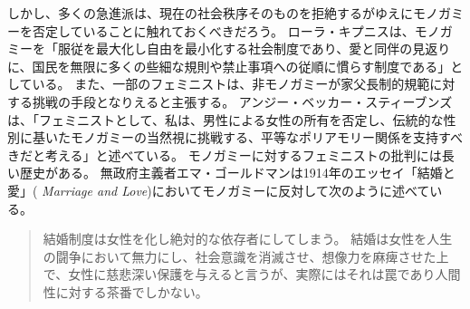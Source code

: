 \documentclass[paper=a4,book,openany]{jlreq}
\newcommand{\ig}[1]{}           %
\begin{document}
しかし、多くの急進派は、現在の社会秩序そのものを拒絶するがゆえにモノガミーを否定していることに触れておくべきだろう。
ローラ・キプニスは、モノガミーを「服従を最大化し自由を最小化する社会制度であり、愛と同伴の見返りに、国民を無限に多くの些細な規則や禁止事項への従順に慣らす制度である」としている\citep{kipnis03:_troub_marriag}。
また、一部のフェミニストは、非モノガミーが家父長制的規範に対する挑戦の手段となりえると主張する。
アンジー・ベッカー・スティーブンズは、「フェミニストとして、私は、男性による女性の所有を否定し、伝統的な性別に基いたモノガミーの当然視に挑戦する、平等なポリアモリー関係を支持すべきだと考える」と述べている\citep{stevens13:_shoul_femin_be_critic_compul_monog}。
モノガミーに対するフェミニストの批判には長い歴史がある。
無政府主義者エマ・ゴールドマンは1914年のエッセイ「結婚と愛」( \emph{Marriage and Love})においてモノガミーに反対して次のように述べている。

\begin{quote}
結婚制度は女性を化し絶対的な依存者にしてしまう。
結婚は女性を人生の闘争において無力にし、社会意識を消滅させ、想像力を麻痺させた上で、女性に慈悲深い保護を与えると言うが、実際にはそれは罠であり人間性に対する茶番でしかない。
\citep{goldman14:_marriag_love}\ig{Emma Goldman}
\end{quote}
\end{document}
